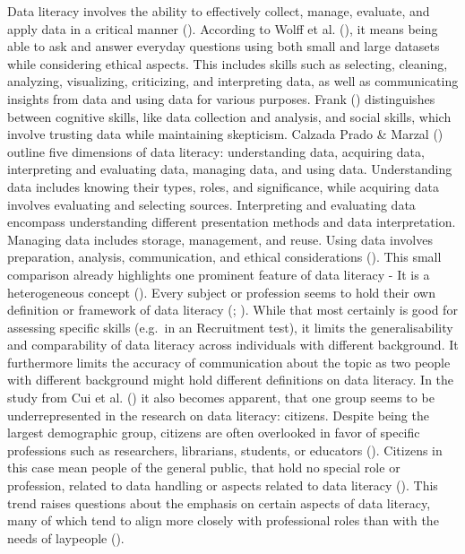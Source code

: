 \documentclass[
  12pt,
  a4paper,
  twoside]{article}
\begin{document}
Data literacy involves the ability to effectively collect, manage, evaluate, and apply data in a critical manner (). According to Wolff et al. (), it means being able to ask and answer everyday questions using both small and large datasets while considering ethical aspects. This includes skills such as selecting, cleaning, analyzing, visualizing, criticizing, and interpreting data, as well as communicating insights from data and using data for various purposes. Frank () distinguishes between cognitive skills, like data collection and analysis, and social skills, which involve trusting data while maintaining skepticism. Calzada Prado \& Marzal () outline five dimensions of data literacy: understanding data, acquiring data, interpreting and evaluating data, managing data, and using data. Understanding data includes knowing their types, roles, and significance, while acquiring data involves evaluating and selecting sources. Interpreting and evaluating data encompass understanding different presentation methods and data interpretation. Managing data includes storage, management, and reuse. Using data involves preparation, analysis, communication, and ethical considerations ().
This small comparison already highlights one prominent feature of data literacy - It is a heterogeneous concept (). Every subject or profession seems to hold their own definition or framework of data literacy (; ). While that most certainly is good for assessing specific skills (e.g.~in an Recruitment test), it limits the generalisability and comparability of data literacy across individuals with different background. It furthermore limits the accuracy of communication about the topic as two people with different background might hold different definitions on data literacy. In the study from Cui et al. () it also becomes apparent, that one group seems to be underrepresented in the research on data literacy: citizens.
Despite being the largest demographic group, citizens are often overlooked in favor of specific professions such as researchers, librarians, students, or educators (). Citizens in this case mean people of the general public, that hold no special role or profession, related to data handling or aspects related to data literacy (). This trend raises questions about the emphasis on certain aspects of data literacy, many of which tend to align more closely with professional roles than with the needs of laypeople ().
\end{document}
